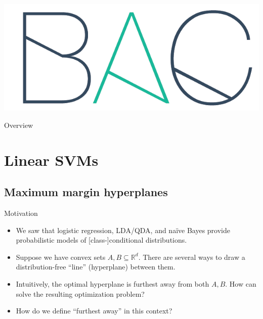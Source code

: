 \documentclass{beamer}
\title[\lecturetitle]{\lecturetitle}
\author[Derek Huang (BAC Advanced Team)]{Derek Huang}
\institute{BAC Advanced Team}
\date{August 14, 2021}
\numberwithin{equation}{section}
\begin{document}
\begin{frame}
    \titlepage
    \centering
    \includegraphics[scale = 0.1]{../bac_logo1.png}
\end{frame}

\begin{frame}{Overview}
    \tableofcontents
\end{frame}


\section{Linear SVMs}

\subsection{Maximum margin hyperplanes}

\begin{frame}{Motivation}
    \begin{itemize}
        \item
        We saw that logistic regression, LDA/QDA, and na\"{i}ve Bayes
        provide probabilistic models of [class-]conditional distributions.

        \item
        Suppose we have convex sets $ A, B \subseteq \mathbb{R}^d $. There are
        several ways to draw a distribution-free ``line'' (hyperplane) between
        them.

        \item
        Intuitively, the optimal hyperplane is furthest away from both
        $ A, B $. How can solve the resulting optimization problem?

        \item
        How do we define ``furthest away'' in this context?
    \end{itemize}
\end{frame}
\end{document}
